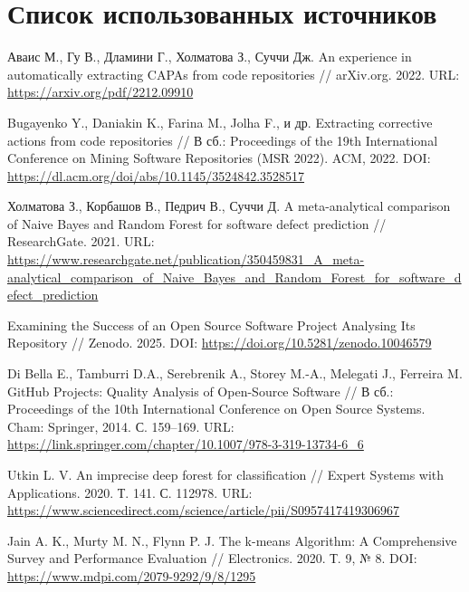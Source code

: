 \chapter*{Список использованных источников}

\begin{thebibliography}{99}
	
	\label{Awais2022}
	Аваис М., Гу В., Дламини Г., Холматова З., Суччи Дж.  
	An experience in automatically extracting CAPAs from code repositories // arXiv.org. 2022.  
	URL: \url{https://arxiv.org/pdf/2212.09910}
	
	\label{Bugayenko2022}
	Bugayenko Y., Daniakin K., Farina M., Jolha F., и др.  
	Extracting corrective actions from code repositories //  
	В сб.: Proceedings of the 19th International Conference on Mining Software Repositories (MSR 2022). ACM, 2022.  
	DOI: \url{https://dl.acm.org/doi/abs/10.1145/3524842.3528517}
	
	\label{Holmatova2021}
	Холматова З., Корбашов В., Педрич В., Суччи Д.  
	A meta-analytical comparison of Naive Bayes and Random Forest for software defect prediction //  
	ResearchGate. 2021.  
	URL: \url{https://www.researchgate.net/publication/350459831_A_meta-analytical_comparison_of_Naive_Bayes_and_Random_Forest_for_software_defect_prediction}
	
	\label{Zenodo2025}
	Examining the Success of an Open Source Software Project Analysing Its Repository //  
	Zenodo. 2025.  
	DOI: \url{https://doi.org/10.5281/zenodo.10046579}
	
	\label{DiBella2014}
	Di Bella E., Tamburri D.A., Serebrenik A., Storey M.-A., Melegati J., Ferreira M.  
	GitHub Projects: Quality Analysis of Open-Source Software //  
	В сб.: Proceedings of the 10th International Conference on Open Source Systems.  
	Cham: Springer, 2014. С. 159–169.  
	URL: \url{https://link.springer.com/chapter/10.1007/978-3-319-13734-6_6}
	
	\label{Utkin2020}
	Utkin L. V.  
	An imprecise deep forest for classification // Expert Systems with Applications.  
	2020. Т. 141. С. 112978.  
	URL: \url{https://www.sciencedirect.com/science/article/pii/S0957417419306967}
	
	\label{Jain2020}
	Jain A. K., Murty M. N., Flynn P. J.  
	The k-means Algorithm: A Comprehensive Survey and Performance Evaluation //  
	Electronics. 2020. Т. 9, № 8.  
	DOI: \url{https://www.mdpi.com/2079-9292/9/8/1295}
	

\end{thebibliography}
